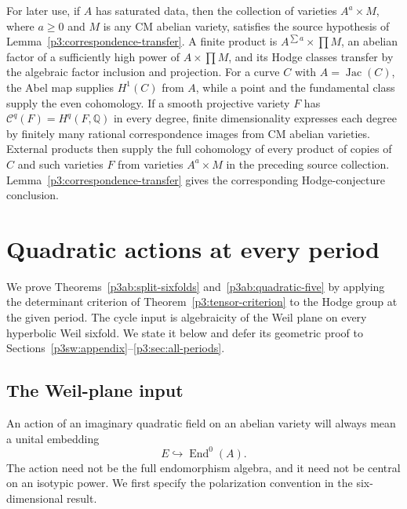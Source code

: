 \documentclass[11pt]{article}
\newcommand{\Q}{\mathbb Q}
\numberwithin{equation}{section}
\begin{document}
For later use, if $A$ has saturated data, then the collection of
varieties $A^a\times M$, where $a\ge0$ and $M$ is any CM abelian
variety, satisfies the source hypothesis of
Lemma~\ref{p3:correspondence-transfer}.  A finite product is
$A^{\sum a}\times\prod M$, an abelian factor of a sufficiently high
power of $A\times\prod M$, and its Hodge classes transfer by the
algebraic factor inclusion and projection.  For a curve $C$ with
$A=\operatorname{Jac}(C)$, the Abel map supplies $H^1(C)$ from
$A$, while a point and the fundamental class supply the even
cohomology.  If a smooth projective variety $F$ has
$\mathcal C^q(F)=H^q(F,\Q)$ in every degree, finite
dimensionality expresses each degree by finitely many rational
correspondence images from CM abelian varieties.  External
products then supply the full cohomology of every product of
copies of $C$ and such varieties $F$ from varieties
$A^a\times M$ in the preceding source collection.
Lemma~\ref{p3:correspondence-transfer} gives the corresponding
Hodge-conjecture conclusion.

\section{Quadratic actions at every period}
\label{p3:sec:abelian}

We prove Theorems~\ref{p3ab:split-sixfolds} and~\ref{p3ab:quadratic-five}
by applying the determinant criterion of
Theorem~\ref{p3:tensor-criterion} to the Hodge group at the given period.
The cycle input is algebraicity of the Weil plane on every hyperbolic
Weil sixfold.  We state it below and defer its geometric proof to
Sections~\ref{p3sw:appendix}--\ref{p3:sec:all-periods}.

\subsection{The Weil-plane input}

An action of an imaginary quadratic field on an abelian variety will
always mean a unital embedding
\[
 E\hookrightarrow\operatorname{End}^0(A).
\]
The action need not be the full endomorphism algebra, and it need not
be central on an isotypic power.  We first specify the polarization
convention in the six-dimensional result.
\end{document}
